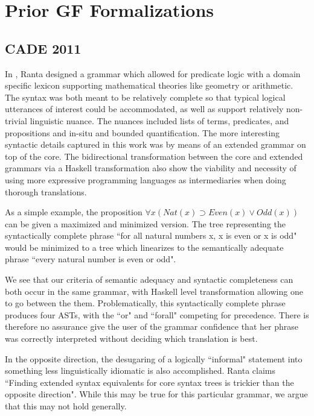 \section{Prior GF Formalizations}

\subsection{CADE 2011} \label{cade}

In \cite{rantaLog}, Ranta designed a grammar which allowed for predicate logic
with a domain specific lexicon supporting mathematical theories like geometry or
arithmetic. The syntax was both meant to be relatively complete so that typical
logical utterances of interest could be accommodated, as well as support
relatively non-trivial linguistic nuance. The nuances included lists of terms,
predicates, and propositions and in-situ and bounded quantification. The more
interesting syntactic details captured in this work was by means of an extended
grammar on top of the core. The bidirectional transformation between the core
and extended grammars via a Haskell transformation also show the viability and
necessity of using more expressive programming languages as intermediaries when
doing thorough translations.

As a simple example, the proposition $\forall x (Nat(x) \supset
Even(x) \lor Odd(x))$ can be given a maximized and minimized version. The tree
representing the syntactically complete phrase ``for all natural numbers
x, x is even or x is odd" would be minimized to a tree which linearizes to the
semantically adequate phrase ``every natural number is even or odd".

We see that our criteria of semantic adequacy and syntactic completeness can
both occur in the same grammar, with Haskell level transformation allowing one
to go between the them. Problematically, this syntactically complete phrase
produces four ASTs, with the ``or" and ``forall" competing for precedence. There
is therefore no assurance give the user of the grammar confidence that her
phrase was correctly interpreted without deciding which translation is best.

In the opposite direction, the desugaring of a logically ``informal" statement
into something less linguistically idiomatic is also accomplished. Ranta claims
``Finding extended syntax equivalents for core syntax trees is trickier than the
opposite direction". While this may be true for this particular grammar, we
argue that this may not hold generally.


